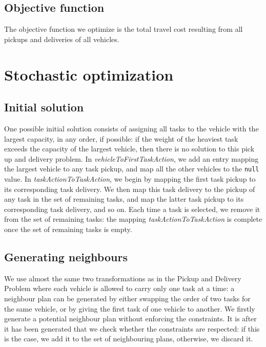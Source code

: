 \documentclass[10pt]{article}
\begin{document}
\subsection{Objective function}
The objective function we optimize is the total travel cost resulting from all pickups and deliveries of all vehicles.

\section{Stochastic optimization}

\subsection{Initial solution}
One possible initial solution consists of assigning all tasks to the vehicle with the largest capacity, in any order, if possible: if the weight of the heaviest task exceeds the capacity of the largest vehicle, then there is no solution to this pick up and delivery problem.
In \textit{vehicleToFirstTaskAction}, we add an entry mapping the largest vehicle to any task pickup, and map all the other vehicles to the \texttt{null} value.
In \textit{taskActionToTaskAction}, we begin by mapping the first task pickup to its corresponding task delivery. We then map this task delivery to the pickup of any task in the set of remaining tasks, and map the latter task pickup to its corresponding task delivery, and so on.
Each time a task is selected, we remove it from the set of remaining tasks: the mapping \textit{taskActionToTaskAction} is complete once the set of remaining tasks is empty.

\subsection{Generating neighbours}
We use almost the same two transformations as in the Pickup and Delivery Problem where each vehicle is allowed to carry only one task at a time: a neighbour plan can be generated by either swapping the order of two tasks for the same vehicle, or by giving the first task of one vehicle to another.
We firstly generate a potential neighbour plan without enforcing the constraints. It is after it has been generated that we check whether the constraints are respected: if this is the case, we add it to the set of neighbouring plans, otherwise, we discard it.
\end{document}
